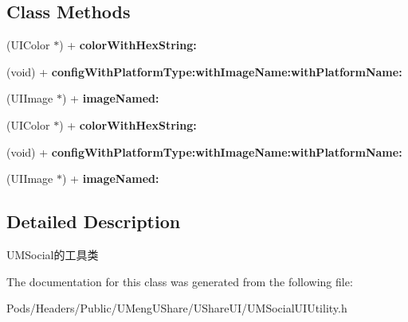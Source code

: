 \subsection*{Class Methods}
\begin{DoxyCompactItemize}
\item 
\mbox{\label{interface_u_m_social_u_i_utility_ab6b919451162e00687b6541cbe30b10e}} 
(U\+I\+Color $\ast$) + {\bfseries color\+With\+Hex\+String\+:}
\item 
\mbox{\label{interface_u_m_social_u_i_utility_a601c2e21500df25a57a7ed5dcedeacd9}} 
(void) + {\bfseries config\+With\+Platform\+Type\+:with\+Image\+Name\+:with\+Platform\+Name\+:}
\item 
\mbox{\label{interface_u_m_social_u_i_utility_ac38392b670e66a35f2403dc2c284a0da}} 
(U\+I\+Image $\ast$) + {\bfseries image\+Named\+:}
\item 
\mbox{\label{interface_u_m_social_u_i_utility_ab6b919451162e00687b6541cbe30b10e}} 
(U\+I\+Color $\ast$) + {\bfseries color\+With\+Hex\+String\+:}
\item 
\mbox{\label{interface_u_m_social_u_i_utility_a601c2e21500df25a57a7ed5dcedeacd9}} 
(void) + {\bfseries config\+With\+Platform\+Type\+:with\+Image\+Name\+:with\+Platform\+Name\+:}
\item 
\mbox{\label{interface_u_m_social_u_i_utility_ac38392b670e66a35f2403dc2c284a0da}} 
(U\+I\+Image $\ast$) + {\bfseries image\+Named\+:}
\end{DoxyCompactItemize}


\subsection{Detailed Description}
U\+M\+Social的工具类 

The documentation for this class was generated from the following file\+:\begin{DoxyCompactItemize}
\item 
Pods/\+Headers/\+Public/\+U\+Meng\+U\+Share/\+U\+Share\+U\+I/U\+M\+Social\+U\+I\+Utility.\+h\end{DoxyCompactItemize}
